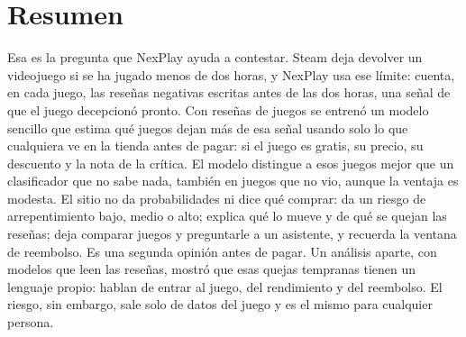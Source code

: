 \section*{Resumen}

\preguntaguia{} Esa es la pregunta que NexPlay ayuda a contestar. Steam deja devolver un videojuego
si se ha jugado menos de dos horas, y NexPlay usa ese límite: cuenta, en cada juego, las reseñas
negativas escritas antes de las dos horas, una señal de que el juego decepcionó pronto. Con \cifraResenasEntrenamiento{} reseñas de
\cifraJuegosEntrenamiento{} juegos se entrenó un modelo sencillo que estima qué juegos dejan más
de esa señal usando solo lo que cualquiera ve en la tienda antes de pagar: si el juego es gratis,
su precio, su descuento y la nota de la crítica. El modelo distingue a esos juegos mejor que un
clasificador que no sabe nada, también en \cifraJuegosExternos{} juegos que no vio, aunque la
ventaja es modesta. El sitio no da probabilidades ni dice qué comprar: da un riesgo de
arrepentimiento bajo, medio o alto; explica qué lo mueve y de qué se quejan las reseñas; deja
comparar juegos y preguntarle a un asistente, y recuerda la ventana de reembolso. Es una segunda
opinión antes de pagar. Un análisis aparte, con modelos que leen las reseñas, mostró que esas quejas tempranas
tienen un lenguaje propio: hablan de entrar al juego, del rendimiento y del reembolso. El riesgo,
sin embargo, sale solo de datos del juego y es el mismo para cualquier persona.
